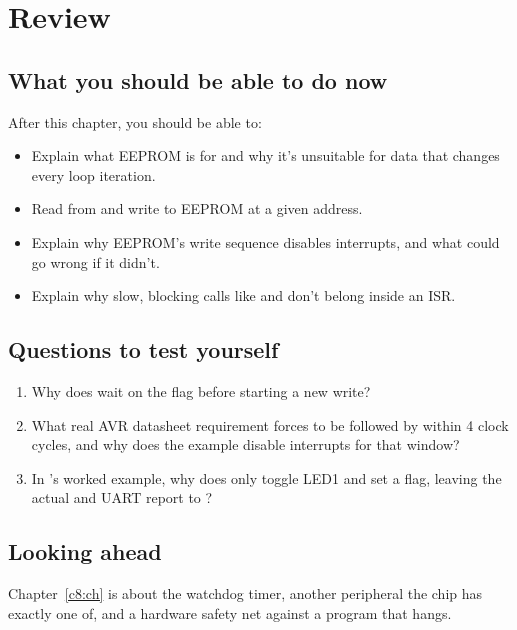 
\section{Review}
\label{c7:sec:review}

\subsection*{What you should be able to do now}
After this chapter, you should be able to:
\begin{itemize}
  \item Explain what EEPROM is for and why it's unsuitable for data that changes every loop
    iteration.
  \item Read from and write to EEPROM at a given address.
  \item Explain why EEPROM's write sequence disables interrupts, and what could go wrong if it
    didn't.
  \item Explain why slow, blocking calls like  and 
    don't belong inside an ISR.
\end{itemize}

\subsection*{Questions to test yourself}
\begin{enumerate}
  \item Why does  wait on the  flag before starting a new
    write?
  \item What real AVR datasheet requirement forces  to be followed by 
    within 4 clock cycles, and why does the example disable interrupts for that window?
  \item In 's worked example, why does  only toggle LED1 and
    set a flag, leaving the actual  and UART report to ?
\end{enumerate}

\subsection*{Looking ahead}
Chapter~\ref{c8:ch} is about the watchdog timer, another peripheral the chip has exactly one of,
and a hardware safety net against a program that hangs.
